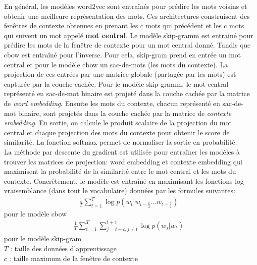 En général, les modèles word2vec sont entraînés pour prédire les mots voisins et obtenir une meilleure représentation des mots.
Ces architectures construisent des fenêtres de contexte obtenues en prenant les c mots qui précédent et les c mots qui suivent un mot appelé \textbf{mot central}. Le modèle skip-gramm est entrainé pour prédire les mots de la fenêtre de contexte pour un mot central donné. Tandis que cbow est entraîné pour l'inverse. Pour cela, skip-gram prend en entrée un mot central et pour le modèle cbow un sac-de-mots (les mots du contexte). La projection de ces entrées par une matrice globale (partagée par les mots) est capturée par la couche cachée. Pour le modèle skip-gramm, le mot central représenté en sac-de-mot binaire est projeté dans la couche cachée par la matrice de \textit{word embedding}\label{text:wordembed}. Ensuite les mots du contexte, chacun représenté en sac-de-mot binaire, sont projetés dans la couche cachée par la matrice de \textit{contexte embedding}. En sortie, on calcule le produit scalaire de la projection du mot central et chaque projection des mots du contexte  pour obtenir le score de similarité. La fonction softmax permet de normaliser la sortie en probabilité.\\

La méthode par descente du gradient est utilisée pour entraîner les modèles à trouver les matrices de projection: word embedding et contexte embedding qui maximisent la probabilité de la similarité entre le mot central et les mots du contexte. Concrètement, le modèle est entraîné en maximisant les fonctions log-vraisemblance (dans tout le vocabulaire) données par les formules suivantes:
\begin{eqnarray}  \frac{1}{T} \sum_{t=1}^{T} \log  p(w_{t}|w_{t-\frac{c}{2}}...w_{t+\frac{c}{2}}) \end{eqnarray} pour le modèle cbow 
\begin{eqnarray} \frac{1}{T} \sum_{t=1}^{T}  \sum_{j= t-c, j\neq t}^{t+c} \log  p(w_{j}|w_{t})\end{eqnarray} pour le modèle skip-gram\\
$T$ : taille des données d'apprentissage\\
$c$ : taille maximum de la fenêtre de contexte\\

